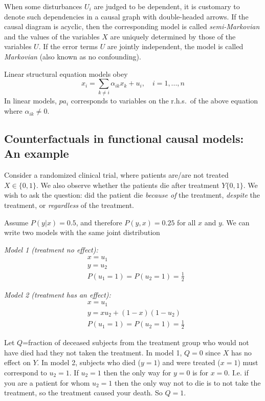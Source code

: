 \documentclass[11pt]{article}
\numberwithin{equation}{section}
\begin{document}
When some disturbances $U_i$ are judged to be dependent, it is customary to denote such dependencies in a causal graph with double-headed arrows. If the causal diagram is acyclic, then the corresponding model is called \textit{semi-Markovian} and the values of the variables $X$ are uniquely determined by those of the variables $U$. If the error terms $U$ are jointly independent, the model is called \textit{Markovian} (also known as no confounding).

Linear structural equation models obey
\begin{equation}
x_i = \sum_{k \neq i} \alpha_{ik} x_k + u_i, \quad i=1,...,n 
\end{equation}
In linear models, $pa_i$ corresponds to variables on the r.h.s.\ of the above equation where $\alpha_{ik} \neq 0$.

\subsection{Counterfactuals in functional causal models: An example} \label{sec:counterfactuals-example}
Consider a randomized clinical trial, where patients are/are not treated $X \in \{0,1\}$. We also observe whether the patients die after treatment $Y\{0,1\}$. We wish to ask the question: did the patient die \textit{because of} the treatment, \textit{despite} the treatment, or \textit{regardless} of the treatment.

Assume $P(y|x) = 0.5$, and therefore $P(y,x)=0.25$ for all $x$ and $y$. We can write two models with the same joint distribution

\textit{Model 1 (treatment no effect):}
\begin{align}
&x=u_1\\
&y=u_2\\
&P(u_1=1) = P(u_2=1)= \frac{1}{2}
\end{align}


\textit{Model 2 (treatment has an effect):}
\begin{align}
&x=u_1\\
&y=xu_2 + (1-x)(1-u_2)\\
&P(u_1=1) = P(u_2=1)= \frac{1}{2}
\end{align}

Let $Q$=fraction of deceased subjects from the treatment group who would not have died had they not taken the treatment. In model 1, $Q=0$ since $X$ has no effect on $Y$. In model 2, subjects who died ($y=1$) and were treated ($x=1$) must correspond to $u_2=1$. If $u_2=1$ then the only way for $y=0$ is for $x=0$. I.e. if you are a patient for whom $u_2=1$ then the only way not to die is to not take the treatment, so the treatment caused your death. So $Q=1$.
\end{document}
